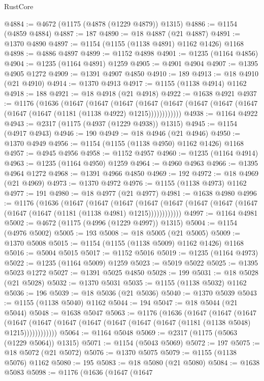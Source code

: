 \begin{lexlean}{RustCore}
\begin{coremodule}
@4884 := @4672 (@1175 (@4878 (@1229 @4879)) @1315)
@4886 := @1154 (@4859 @4884)
@4887 := 187
@4890 := @18 @4887 (@21 @4887)
@4891 := @1370 @4890
@4897 := @1154 (@1155 (@1138 @4891) @1162 @1426) @1168
@4898 := @4886 @4897
@4899 := @1152 @4898
@4901 := @1235 (@1164 @4856)
@4904 := @1235 (@1164 @4891) @1259
@4905 := @4901 @4904
@4907 := @1395 @4905 @1272
@4909 := @1391 @4907 @4850
@4910 := 189
@4913 := @18 @4910 (@21 @4910)
@4914 := @1370 @4913
@4917 := @1155 (@1138 @4914) @1162
@4918 := 188
@4921 := @18 @4918 (@21 @4918)
@4922 := @1638 @4921
@4937 := @1176
    (@1636
      (@1647
        (@1647
          (@1647
            (@1647 (@1647 (@1647 (@1647 (@1647 (@1647 (@1647 (@1181 (@1138 @4922) @1215))))))))))))
@4938 := @1164 @4922
@4943 := @2317 (@1175 (@4937 (@1229 @4938)) @1315)
@4945 := @1154 (@4917 @4943)
@4946 := 190
@4949 := @18 @4946 (@21 @4946)
@4950 := @1370 @4949
@4956 := @1154 (@1155 (@1138 @4950) @1162 @1426) @1168
@4957 := @4945 @4956
@4958 := @1152 @4957
@4960 := @1235 (@1164 @4914)
@4963 := @1235 (@1164 @4950) @1259
@4964 := @4960 @4963
@4966 := @1395 @4964 @1272
@4968 := @1391 @4966 @4850
@4969 := 192
@4972 := @18 @4969 (@21 @4969)
@4973 := @1370 @4972
@4976 := @1155 (@1138 @4973) @1162
@4977 := 191
@4980 := @18 @4977 (@21 @4977)
@4981 := @1638 @4980
@4996 := @1176
    (@1636
      (@1647
        (@1647
          (@1647
            (@1647 (@1647 (@1647 (@1647 (@1647 (@1647 (@1647 (@1181 (@1138 @4981) @1215))))))))))))
@4997 := @1164 @4981
@5002 := @4672 (@1175 (@4996 (@1229 @4997)) @1315)
@5004 := @1154 (@4976 @5002)
@5005 := 193
@5008 := @18 @5005 (@21 @5005)
@5009 := @1370 @5008
@5015 := @1154 (@1155 (@1138 @5009) @1162 @1426) @1168
@5016 := @5004 @5015
@5017 := @1152 @5016
@5019 := @1235 (@1164 @4973)
@5022 := @1235 (@1164 @5009) @1259
@5023 := @5019 @5022
@5025 := @1395 @5023 @1272
@5027 := @1391 @5025 @4850
@5028 := 199
@5031 := @18 @5028 (@21 @5028)
@5032 := @1370 @5031
@5035 := @1155 (@1138 @5032) @1162
@5036 := 196
@5039 := @18 @5036 (@21 @5036)
@5040 := @1370 @5039
@5043 := @1155 (@1138 @5040) @1162
@5044 := 194
@5047 := @18 @5044 (@21 @5044)
@5048 := @1638 @5047
@5063 := @1176
    (@1636
      (@1647
        (@1647
          (@1647
            (@1647 (@1647 (@1647 (@1647 (@1647 (@1647 (@1647 (@1181 (@1138 @5048) @1215))))))))))))
@5064 := @1164 @5048
@5069 := @2317 (@1175 (@5063 (@1229 @5064)) @1315)
@5071 := @1154 (@5043 @5069)
@5072 := 197
@5075 := @18 @5072 (@21 @5072)
@5076 := @1370 @5075
@5079 := @1155 (@1138 @5076) @1162
@5080 := 195
@5083 := @18 @5080 (@21 @5080)
@5084 := @1638 @5083
@5098 := @1176
    (@1636
      (@1647
        (@1647

\end{coremodule}
\end{lexlean}
